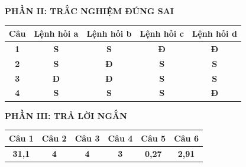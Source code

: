 \documentclass[11pt,a4paper]{article}
\begin{document}
\vspace{0.3cm}
\noindent\textbf{\color{mainGreen}PHẦN II: TRẮC NGHIỆM ĐÚNG SAI}
\begin{center}
\renewcommand{\arraystretch}{1.2}
\begin{tabular}{|c|c|c|c|c|}
\hline
\textbf{Câu} & \textbf{Lệnh hỏi a} & \textbf{Lệnh hỏi b} & \textbf{Lệnh hỏi c} & \textbf{Lệnh hỏi d} \\ \hline
\textbf{1} & \textbf{S} & \textbf{S} & \textbf{\color{red}Đ} & \textbf{\color{red}Đ} \\ \hline
\textbf{2} & \textbf{S} & \textbf{\color{red}Đ} & \textbf{S} & \textbf{S} \\ \hline
\textbf{3} & \textbf{\color{red}Đ} & \textbf{\color{red}Đ} & \textbf{S} & \textbf{S} \\ \hline
\textbf{4} & \textbf{S} & \textbf{S} & \textbf{S} & \textbf{\color{red}Đ} \\ \hline
\end{tabular}
\end{center}

\vspace{0.3cm}
\noindent\textbf{\color{mainGreen}PHẦN III: TRẢ LỜI NGẮN}
\begin{center}
\renewcommand{\arraystretch}{1.2}
\begin{tabular}{|c|c|c|c|c|c|}
\hline
\textbf{Câu 1} & \textbf{Câu 2} & \textbf{Câu 3} & \textbf{Câu 4} & \textbf{Câu 5} & \textbf{Câu 6} \\ \hline
\textbf{\color{red}31,1} & \textbf{\color{red}4} & \textbf{\color{red}4} & \textbf{\color{red}3} & \textbf{\color{red}0,27} & \textbf{\color{red}2,91} \\ \hline
\end{tabular}
\end{center}
\end{document}
